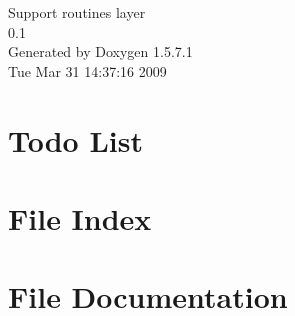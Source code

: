 \documentclass[a4paper]{book}
\begin{document}
\begin{titlepage}
\vspace*{7cm}
\begin{center}
{\Large Support routines layer \\[1ex]\large 0.1 }\\
\vspace*{1cm}
{\large Generated by Doxygen 1.5.7.1}\\
\vspace*{0.5cm}
{\small Tue Mar 31 14:37:16 2009}\\
\end{center}
\end{titlepage}
\clearemptydoublepage
{}
\tableofcontents
\clearemptydoublepage
{}
\chapter{Todo List}
\label{todo}

\chapter{File Index}

\chapter{File Documentation}












\printindex
\end{document}
